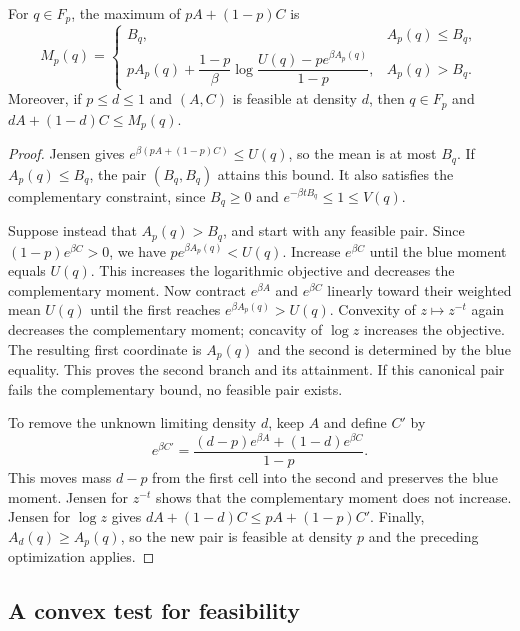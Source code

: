\begin{lemma}\label{lem:optimizer}
For $q\in F_p$, the maximum of $pA+(1-p)C$ is
\begin{equation}\label{eq:optimizer}
 M_p(q)=
 \begin{cases}
 B_q,& A_p(q)\le B_q,\\[1mm]
 pA_p(q)+\dfrac{1-p}{\beta}
 \log\dfrac{U(q)-p e^{\beta A_p(q)}}{1-p},& A_p(q)>B_q.
 \end{cases}
\end{equation}
Moreover, if $p\le d\le1$ and $(A,C)$ is feasible at density $d$,
then $q\in F_p$ and $dA+(1-d)C\le M_p(q)$.
\end{lemma}
\begin{proof}
Jensen gives $e^{\beta(pA+(1-p)C)}\le U(q)$, so the mean is at most
$B_q$. If $A_p(q)\le B_q$, the pair $(B_q,B_q)$ attains this bound.
It also satisfies the complementary constraint, since $B_q\ge0$ and
$e^{-\beta tB_q}\le1\le V(q)$.

Suppose instead that $A_p(q)>B_q$, and start with any feasible pair.
Since $(1-p)e^{\beta C}>0$, we have $p e^{\beta A_p(q)}<U(q)$.
Increase $e^{\beta C}$ until the blue moment equals $U(q)$.
This increases the logarithmic objective and decreases the
complementary moment. Now contract $e^{\beta A}$ and $e^{\beta C}$ linearly
toward their weighted mean $U(q)$ until the first reaches
$e^{\beta A_p(q)}>U(q)$. Convexity of $z\mapsto z^{-t}$ again decreases
the complementary moment; concavity of $\log z$ increases the objective.
The resulting first coordinate is $A_p(q)$ and the second is determined by
the blue equality. This proves the second branch and its attainment.
If this canonical pair fails the complementary bound, no feasible pair exists.

To remove the unknown limiting density $d$, keep $A$ and define $C'$ by
\[
 e^{\beta C'}=\frac{(d-p)e^{\beta A}+(1-d)e^{\beta C}}{1-p}.
\]
This moves mass $d-p$ from the first cell into the second and preserves
the blue moment. Jensen for $z^{-t}$ shows that the complementary moment
does not increase. Jensen for $\log z$ gives
$dA+(1-d)C\le pA+(1-p)C'$. Finally, $A_d(q)\ge A_p(q)$, so the new pair
is feasible at density $p$ and the preceding optimization applies.
\end{proof}

\subsection{A convex test for feasibility}

